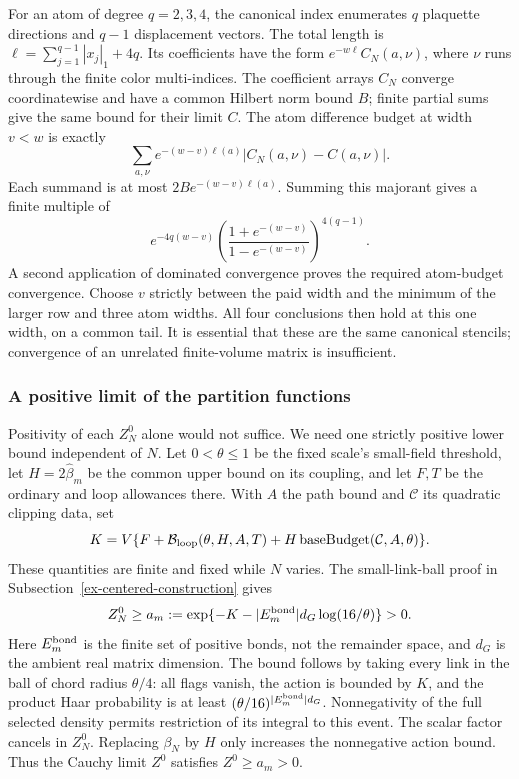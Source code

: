 For an atom of degree $q=2,3,4$, the canonical index enumerates
$q$ plaquette directions and $q-1$ displacement vectors. The total
length is $\ell=\sum_{j=1}^{q-1}|x_j|_1+4q$. Its coefficients have
the form $e^{-w\ell}C_N(a,\nu)$, where $\nu$ runs through the
finite color multi-indices. The coefficient arrays $C_N$ converge
coordinatewise and have a common Hilbert norm bound $B$; finite
partial sums give the same bound for their limit $C$. The atom
difference budget at width $v<w$ is exactly
\[
 \sum_{a,\nu}e^{-(w-v)\ell(a)}|C_N(a,\nu)-C(a,\nu)|.
\]
Each summand is at most $2B e^{-(w-v)\ell(a)}$. Summing this
majorant gives a finite multiple of
\[
 e^{-4q(w-v)}\left(\frac{1+e^{-(w-v)}}{1-e^{-(w-v)}}\right)^{4(q-1)}.
\]
A second application of dominated convergence proves the required
atom-budget convergence. Choose $v$ strictly between the paid
width and the minimum of the larger row and three atom widths.
All four conclusions then hold at this one width, on a common
tail. It is essential that these are the same canonical stencils;
convergence of an unrelated finite-volume matrix is insufficient.

\subsubsection{A positive limit of the partition functions}
Positivity of each $Z_N^0$ alone would not suffice. We need one
strictly positive lower bound independent of $N$. Let $0<\theta\le1$
be the fixed scale's small-field threshold, let $H=2\widehat\beta_m$
be the common upper bound on its coupling, and let $F,T$ be the
ordinary and loop allowances there. With $A$ the path bound and
$\mathcal C$ its quadratic clipping data, set
\[
 K=V\{F+\mathcal B_{\rm loop}(\theta,H,A,T)
                 +H\operatorname{baseBudget}(\mathcal C,A,\theta)\}.
\]
These quantities are finite and fixed while $N$ varies. The
small-link-ball proof in Subsection~\ref{ex-centered-construction}
gives
\begin{equation}\label{eq:fixed-rung-partition-positive}
 Z_N^0\ge a_m:=
 \exp\{-K-|E_m^{\rm bond}|d_G\log(16/\theta)\}>0.
\end{equation}
Here $E_m^{\rm bond}$ is the finite set of positive bonds, not the
remainder space, and $d_G$ is the ambient real matrix dimension.
The bound follows by taking every link in the ball of chord radius
$\theta/4$: all flags vanish, the action is bounded by $K$, and
the product Haar probability is at least
$(\theta/16)^{|E_m^{\rm bond}|d_G}$. Nonnegativity of the full
selected density permits restriction of its integral to this event.
The scalar factor cancels in $Z_N^0$. Replacing $\beta_N$ by $H$
only increases the nonnegative action bound. Thus the Cauchy limit
$Z^0$ satisfies $Z^0\ge a_m>0$.

